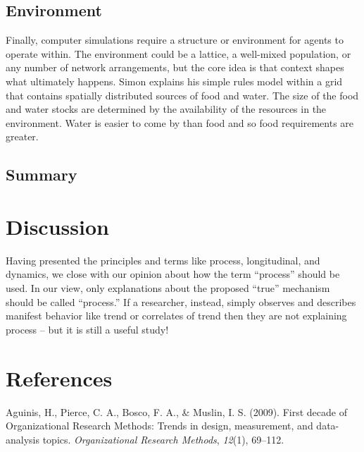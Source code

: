 \documentclass[english,,man]{apa6}
\theoremstyle{definition}
\theoremstyle{definition}
\theoremstyle{definition}
\theoremstyle{remark}
\begin{document}
\hypertarget{environment}{%
\subsection{Environment}\label{environment}}

Finally, computer simulations require a structure or environment for
agents to operate within. The environment could be a lattice, a
well-mixed population, or any number of network arrangements, but the
core idea is that context shapes what ultimately happens. Simon explains
his simple rules model within a grid that contains spatially distributed
sources of food and water. The size of the food and water stocks are
determined by the availability of the resources in the environment.
Water is easier to come by than food and so food requirements are
greater.

\hypertarget{summary-2}{%
\subsection{Summary}\label{summary-2}}

\hypertarget{discussion}{%
\section{Discussion}\label{discussion}}

Having presented the principles and terms like process, longitudinal,
and dynamics, we close with our opinion about how the term
\enquote{process} should be used. In our view, only explanations about
the proposed \enquote{true} mechanism should be called
\enquote{process.} If a researcher, instead, simply observes and
describes manifest behavior like trend or correlates of trend then they
are not explaining process -- but it is still a useful study!

\newpage

\hypertarget{references}{%
\section{References}\label{references}}

\setlength{\parindent}{-0.5in}
\setlength{\leftskip}{0.5in}

\hypertarget{refs}{}
\leavevmode\hypertarget{ref-aguinis_first_2009}{}%
Aguinis, H., Pierce, C. A., Bosco, F. A., \& Muslin, I. S. (2009). First
decade of Organizational Research Methods: Trends in design,
measurement, and data-analysis topics. \emph{Organizational Research
Methods}, \emph{12}(1), 69--112.
\end{document}
